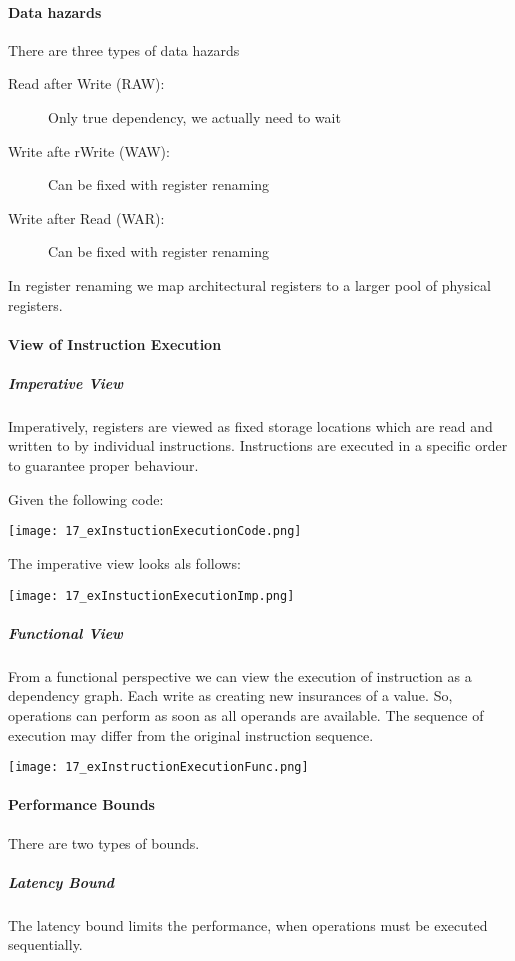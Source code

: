 \paragraph{Data hazards}
There are three types of data hazards

\begin{description}
    \item[Read after Write (RAW):]  Only true dependency, we actually need to wait
    \item[Write afte rWrite (WAW):] Can be fixed with  register renaming
    \item[Write after Read (WAR):] Can be fixed with register renaming
\end{description}

In register renaming we map architectural registers to a larger pool of physical registers.

\paragraph{View of Instruction Execution}
\subparagraph{Imperative View}
Imperatively, registers are viewed as fixed storage locations which are read and written to by individual instructions. Instructions are executed in a specific order to guarantee proper behaviour.

Given the following code:

\texttt{[image: 17\_exInstuctionExecutionCode.png]}

The imperative view looks als follows:

\texttt{[image: 17\_exInstuctionExecutionImp.png]}

\subparagraph{Functional View}
From a functional perspective we can view the execution of instruction as a dependency graph. Each write as creating new insurances of a value. So, operations can perform as soon as all operands are available. The sequence of execution may differ from the original instruction sequence.

\texttt{[image: 17\_exInstructionExecutionFunc.png]}

\paragraph{Performance Bounds}
There are two types of bounds.
\subparagraph{Latency Bound}
The latency bound limits the performance, when operations must be executed sequentially.

